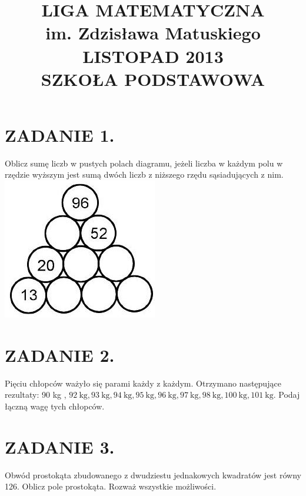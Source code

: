 \documentclass[10pt]{article}
\title{LIGA MATEMATYCZNA \\
 im. Zdzisława Matuskiego \\
 LISTOPAD 2013 \\
 SZKOŁA PODSTAWOWA }
\author{}
\date{}
\begin{document}
\maketitle
\section*{ZADANIE 1.}
Oblicz sumę liczb w pustych polach diagramu, jeżeli liczba w każdym polu w rzędzie wyższym jest sumą dwóch liczb z niższego rzędu sąsiadujących z nim.\\
\includegraphics[max width=\textwidth, center]{2024_11_21_6d866016f49aaf506f81g-1}

\section*{ZADANIE 2.}
Pięciu chłopców ważyło się parami każdy z każdym. Otrzymano następujące rezultaty: 90 kg , \(92 \mathrm{~kg}, 93 \mathrm{~kg}, 94 \mathrm{~kg}, 95 \mathrm{~kg}, 96 \mathrm{~kg}, 97 \mathrm{~kg}, 98 \mathrm{~kg}, 100 \mathrm{~kg}, 101 \mathrm{~kg}\). Podaj łączną wagę tych chłopców.

\section*{ZADANIE 3.}
Obwód prostokąta zbudowanego z dwudziestu jednakowych kwadratów jest równy 126. Oblicz pole prostokąta. Rozważ wszystkie możliwości.
\end{document}
